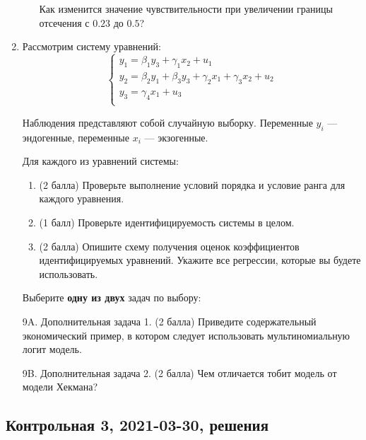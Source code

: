 \begin{enumerate}
\begin{enumerate}
Как изменится значение чувствительности при увеличении границы отсечения с $0.23$ до $0.5$? 
\end{enumerate}


\item Рассмотрим систему уравнений:
\[
\begin{cases}
y_1 = \beta_1 y_3 + \gamma_1 x_2 + u_1 \\
y_2 = \beta_2 y_1 + \beta_3 y_3 + \gamma_2 x_1 + \gamma_3 x_2 + u_2 \\
y_3 = \gamma_4 x_1 + u_3 \\
\end{cases}
\]

Наблюдения представляют собой случайную выборку. Переменные $y_i$ — эндогенные, переменные $x_i$ — экзогенные.

Для каждого из уравнений системы:

\begin{enumerate}
\item (2 балла) Проверьте выполнение условий порядка и условие ранга для каждого уравнения. 
\item  (1 балл) Проверьте идентифицируемость системы в целом. 
\item  (2 балла) Опишите схему получения оценок коэффициентов идентифицируемых уравнений. Укажите все регрессии, которые вы будете использовать. 

\end{enumerate}


Выберите \textbf{одну из двух} задач по выбору:

        
\item[9A.] Дополнительная задача 1. (2 балла) Приведите содержательный экономический пример, в котором следует использовать мультиномиальную логит модель.
 
\item[9B.] Дополнительная задача 2. (2 балла) Чем отличается тобит модель от модели Хекмана?
\end{enumerate}



\subsection{Контрольная 3, 2021-03-30, решения}

